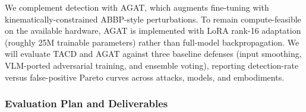 We complement detection with AGAT, which augments fine-tuning with kinematically-constrained ABBP-style perturbations. To remain compute-feasible on the available hardware, AGAT is implemented with LoRA rank-16 adaptation (roughly 25M trainable parameters) rather than full-model backpropagation. We will evaluate TACD and AGAT against three baseline defenses (input smoothing, VLM-ported adversarial training, and ensemble voting), reporting detection-rate versus false-positive Pareto curves across attacks, models, and embodiments.

\subsubsection{Evaluation Plan and Deliverables} \label{sec:t1_evaluation}
\begin{table}{\vspace{-3ex}}
\centering
\caption{(\textbf{T})raining \& (\textbf{I})nference defenses.}\vspace{-2ex}
\label{tab:defense}
\vspace{-2ex}
\end{table}
